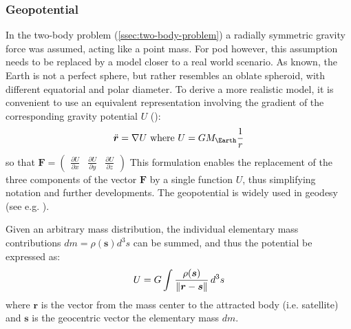 \subsubsection{Geopotential}\label{sssec:geopotential}

In the two-body problem (\autoref{ssec:two-body-problem}) a radially symmetric 
gravity force was assumed, acting like a point mass. For \gls{pod} however, this 
assumption needs to be replaced by a model closer to a real world scenario.
As known, the Earth is not a perfect sphere, but rather resembles an oblate spheroid, 
with different equatorial and polar diameter. To derive a more realistic model, 
it is convenient to use an equivalent representation involving the gradient of 
the corresponding gravity potential $U$ (\cite{Montenbruck2000}):
\begin{equation}
  \label{eq:geopotential}
  \ddot{\bm{r}} = \nabla U \textrm{ where } U = G M_{\Earth} \frac{1}{r}
\end{equation}
so that 
$\bm{F} = \begin{pmatrix} \frac{\partial U}{\partial x} & \frac{\partial U}{\partial y} & \frac{\partial U}{\partial z} \end{pmatrix}$
This formulation enables the replacement of the three components of the vector 
$\bm{F}$ by a single function $U$, thus simplifying notation and further 
developments. The geopotential is widely used in geodesy (see e.g. \cite{Moritz2005}).

Given an arbitrary mass distribution, the individual elementary mass contributions 
$dm = \rho (\bm{s}) d^3 s$ can be summed, and thus the potential be expressed as:
\begin{equation}\label{eq:mont34}
  U = G \int \frac{\rho (\bm{s})}{\lVert\bm{r}-\bm{s}\rVert} \, d^3 s
\end{equation}
where $\bm{r}$ is the vector from the mass center to the attracted body (i.e. satellite) 
and $\bm{s}$ is the geocentric vector the elementary mass $dm$.

